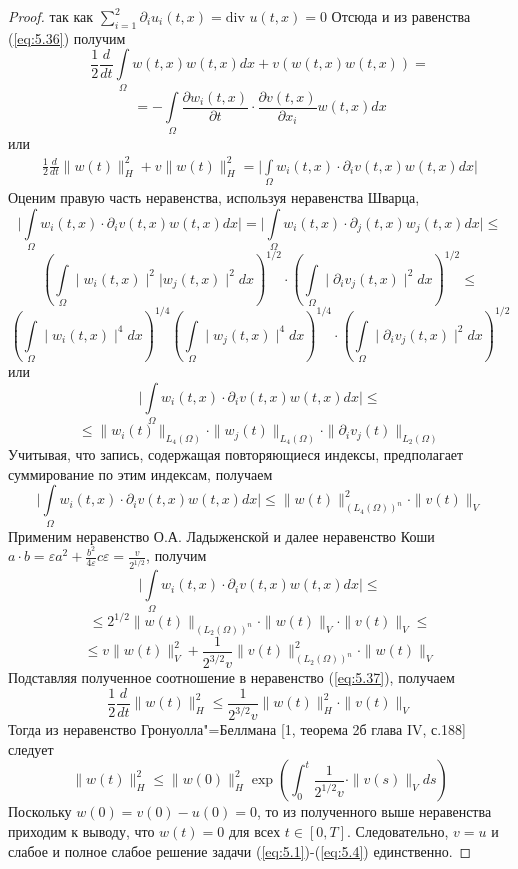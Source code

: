 \begin{proof}
    так как $\sum\limits_{i=1}^{2}\partial_iu_i(t, x)= \textrm{div } u(t, x)=0$
    Отсюда и из равенства (\ref{eq:5.36}) получим
    $$\frac{1}{2}\frac{d}{dt}\int\limits_\Omega w(t, x)w(t, x)dx+v(w(t, x)w(t, x))=$$
    $$=-\int\limits_\Omega\frac{\partial w_i(t, x)}{\partial t}\cdot\frac{\partial v(t, x)}{\partial x_i}w(t, x)dx$$
    или
    \begin{equation}\label{eq:5.37}
        \begin{gathered}
            \frac{1}{2}\frac{d}{dt}\| w(t)\|_H^2+v\| w(t)\|_H^2=
            \bigg|\int\limits_\Omega w_i(t, x)\cdot\partial_iv(t, x)w(t, x)dx\bigg|
        \end{gathered}
    \end{equation}
    Оценим правую часть неравенства, используя неравенства Шварца,
    $$\bigg|\int\limits_\Omega w_i(t, x)\cdot\partial_iv(t, x)w(t, x)dx\bigg|=
    \bigg|\int\limits_\Omega w_i(t, x)\cdot\partial_j(t, x)w_j(t, x)dx\bigg|\le$$
    $$\left(\int\limits_\Omega \mid w_i(t, x)\mid^2|w_j(t, x)\mid^2dx \right)^{1/2}
    \cdot\left(\int\limits_\Omega\mid\partial_iv_j(t, x) \mid^2dx \right)^{1/2}\le$$
    $$\left(\int\limits_\Omega \mid w_i(t, x)\mid^4dx\right)^{1/4}\left(\int\limits_\Omega \mid w_j(t, x)\mid^4dx\right)^{1/4}
    \cdot\left(\int\limits_\Omega\mid\partial_iv_j(t, x) \mid^2dx \right)^{1/2}$$
    или
    $$\bigg|\int\limits_\Omega w_i(t, x)\cdot\partial_iv(t, x)w(t, x)dx\bigg|\le$$
    $$\le\| w_i(t)\|_{L_4(\Omega)}\cdot\| w_j(t)\|_{L_4(\Omega)}\cdot\|\partial_iv_j(t)\|_{L_2(\Omega)}$$
    Учитывая, что запись, содержащая повторяющиеся индексы, предполагает суммирование по этим индексам, получаем
    $$\bigg|\int\limits_\Omega w_i(t, x)\cdot\partial_iv(t, x)w(t, x)dx\bigg|\le\| w(t)\|_{(L_4(\Omega))^n}^2\cdot\| v(t)\|_V$$
    Применим неравенство О.А. Ладыженской и далее неравенство Коши \linebreak
    $a\cdot b=\varepsilon a^2+\frac{b^2}{4\varepsilon}c\varepsilon=\frac{v}{2^{1/2}}$, получим
    $$\bigg|\int\limits_\Omega w_i(t, x)\cdot\partial_iv(t, x)w(t, x)dx\bigg|\le$$
    $$\le 2^{1/2}\| w(t)\|_{(L_2(\Omega))^n}\cdot\| w(t)\|_V\cdot\| v(t)\|_V\le$$
    $$\le v\| w(t)\|_V^2+\frac{1}{2^{3/2}v}\| v(t)\|_{(L_2(\Omega))^n}^2\cdot\| w(t)\|_V$$
    Подставляя полученное соотношение в неравенство (\ref{eq:5.37}), получаем
    $$\frac{1}{2}\frac{d}{dt}\| w(t)\|_H^2\le\frac{1}{2^{3/2}v}\| w(t)\|_H^2\cdot\| v(t)\|_V$$
    Тогда из неравенство Гронуолла"=Беллмана [1, теорема 2б глава IV, с.188] следует
    $$\| w(t)\|_H^2\le\| w(0)\|_H^2\exp\left(\int_0^t\frac{1}{2^{1/2}v}\cdot\| v(s)\|_Vds\right)$$
    Поскольку $w(0) = v(0)- u(0) = 0$, то из полученного выше неравенства приходим к выводу,
    что $w(t)=0$ для всех $t\in[0, T]$. Следовательно, $v=u$ и слабое и полное слабое решение задачи (\ref{eq:5.1})-(\ref{eq:5.4}) единственно.
\end{proof}
